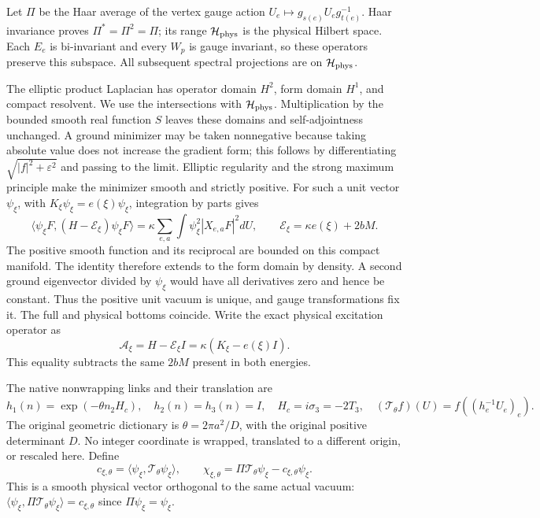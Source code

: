 \documentclass[
  11pt,
]{article}
\begin{document}
Let \(\Pi\) be the Haar average of the vertex gauge action
\(U_e\mapsto g_{s(e)}U_eg_{t(e)}^{-1}\). Haar invariance proves
\(\Pi^* =\Pi^2=\Pi\); its range \(\mathcal H_{\rm phys}\) is the
physical Hilbert space. Each \(E_e\) is bi-invariant and every \(W_p\)
is gauge invariant, so these operators preserve this subspace. All
subsequent spectral projections are on \(\mathcal H_{\rm phys}\).

The elliptic product Laplacian has operator domain \(H^2\), form domain
\(H^1\), and compact resolvent. We use the intersections with
\(\mathcal H_{\rm phys}\). Multiplication by the bounded smooth real
function \(S\) leaves these domains and self-adjointness unchanged. A
ground minimizer may be taken nonnegative because taking absolute value
does not increase the gradient form; this follows by differentiating
\(\sqrt{|f|^2+\varepsilon^2}\) and passing to the limit. Elliptic
regularity and the strong maximum principle make the minimizer smooth
and strictly positive. For such a unit vector \(\psi_\xi\), with
\(K_\xi\psi_\xi=e(\xi)\psi_\xi\), integration by parts gives \[
 \langle\psi_\xi F,(H-\mathcal E_\xi)\psi_\xi F\rangle
 =\kappa\sum_{e,a}\int\psi_\xi^2|X_{e,a}F|^2dU,
 \qquad\mathcal E_\xi=\kappa e(\xi)+2bM.
\tag{1.3}
\] The positive smooth function and its reciprocal are bounded on this
compact manifold. The identity therefore extends to the form domain by
density. A second ground eigenvector divided by \(\psi_\xi\) would have
all derivatives zero and hence be constant. Thus the positive unit
vacuum is unique, and gauge transformations fix it. The full and
physical bottoms coincide. Write the exact physical excitation operator
as \[
 \mathscr A_\xi=H-\mathcal E_\xi I
       =\kappa(K_\xi-e(\xi)I).
\tag{1.4}
\] This equality subtracts the same \(2bM\) present in both energies.

The native nonwrapping links and their translation are \[
 h_1(n)=\exp(-\theta n_2H_c),\quad h_2(n)=h_3(n)=I,
 \quad H_c=i\sigma_3=-2T_3,\quad
 (\mathcal T_\theta f)(U)=f((h_e^{-1}U_e)_e).
\tag{1.5}
\] The original geometric dictionary is \(\theta=2\pi a^2/D\), with the
original positive determinant \(D\). No integer coordinate is wrapped,
translated to a different origin, or rescaled here. Define \[
 c_{\xi,\theta}=\langle\psi_\xi,\mathcal T_\theta\psi_\xi\rangle,
 \qquad
 \chi_{\xi,\theta}=\Pi\mathcal T_\theta\psi_\xi
                      -c_{\xi,\theta}\psi_\xi.
\tag{1.6}
\] This is a smooth physical vector orthogonal to the same actual
vacuum: \(\langle\psi_\xi,\Pi\mathcal T_\theta\psi_\xi\rangle
=c_{\xi,\theta}\) since \(\Pi\psi_\xi=\psi_\xi\).
\end{document}
